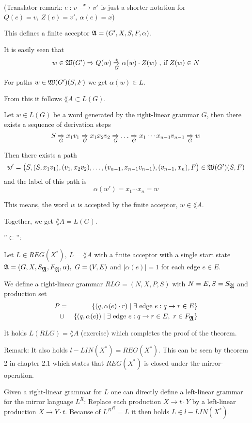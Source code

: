 (Translator remark: $e: v \xrightarrow{\ {x}\ } v'$ is just a shorter notation for $Q(e) =
v, \ Z(e) = v',\ \alpha(e) = x$)

This defines a finite acceptor $\mbox{$\mathfrak{A}$} = (G', X, S, F, \alpha)$.

It is easily seen that
\[ w \in \mbox{$\mathfrak{W}(G')$} \Rightarrow Q(w) \underset{G}{\overset{*}{\Rightarrow}} \alpha(w) \cdot Z(w) \mbox{
 , if } Z(w) \in N\]

For paths $w \in \mbox{$\mathfrak{W}(G')$}(S, F)$ we get $\alpha(w) \in L$.

From this it follows $\lang{A} \subset L(G)$.

Let $w \in L(G)$ be a word generated by the right-linear grammar $G$, then there
exists a sequence of derivation steps
\[ S \underset{G}{\Rightarrow} x_1 v_1 \underset{G}{\Rightarrow} x_1 x_2 v_2 \underset{G}{\Rightarrow} \ldots
\underset{G}{\Rightarrow} x_1 \cdots x_{n-1} v_{n-1} \underset{G}{\Rightarrow} w \]

Then there exists a path 
\[ w' = \big(S, (S,x_1 v_1), (v_1, x_2 v_2), \ldots, (v_{n-1}, x_{n-1} v_{n-1}),
(v_{n-1}, x_n), F\big) \in \mbox{$\mathfrak{W}(G')$}(S, F) \]
and the label of this path is
\[ \alpha(w') = x_1 \cdots x_n = w \]

This means, the word $w$ is accepted by the finite acceptor, $w \in \lang{A}$.

Together, we get $\lang{A} = L(G)$.

''$\subset$'':

Let $L \in REG(X^*),\ L = \lang{A}$ with a finite acceptor with a single start
state $\mbox{$\mathfrak{A}$} = (G, X, S_{\mbox{$\mathfrak{A}$}}, F_{\mbox{$\mathfrak{A}$}}, \alpha),\ G = (V, E)$ 
and $|\alpha(e)| = 1$ for each edge $e \in E$.

We define a right-linear grammar $RLG = (N, X, P, S)$ with $N = E, S =
S_{\mbox{$\mathfrak{A}$}}$ and production set
\begin{eqnarray*}
P & = & \mbox{$\{(q, \alpha(e) \cdot r) \mid \exists \mbox{ edge } e : q \to r \in
E\}$} \\
& \cup & \mbox{$\{(q, \alpha(e)) \mid \exists \mbox{ edge } e : q \to r \in E,\ r
\in F_{\mbox{$\mathfrak{A}$}}\}$}
\end{eqnarray*}

It holds $L(RLG) = \lang{A}$ (exercise) which completes the proof of the
theorem.

Remark: It also holds $l{-}LIN(X^*) = REG(X^*)$. This can be seen by theorem 2
in chapter 2.1 which states that $REG(X^*)$ is closed under the
mirror-operation.

Given a right-linear grammar for $L$ one can directly define a left-linear
grammar for the mirror language $L^R$: Replace each production $X \to t \cdot Y$
by a left-linear production $X \to Y \cdot t$. Because of ${L^R}^R = L$ it then
holds $L \in l{-}LIN(X^*)$.

